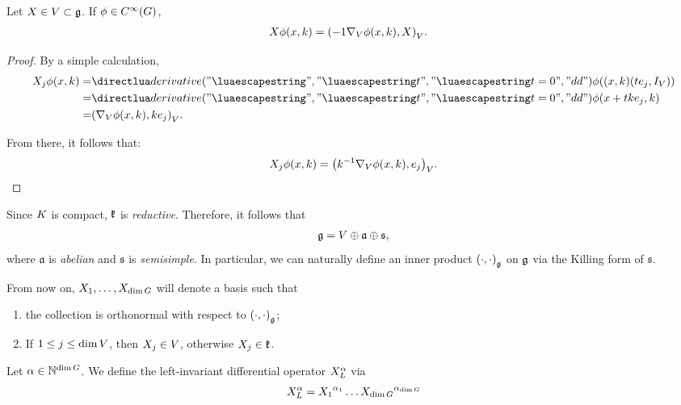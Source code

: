 \begin{lemma}
    Let $X \in \VectorSpace \subset \LieAlgebra$.
    If $\phi \in \SmoothFunctions\Group$,
    \begin{align*}
        \LeftDifferentialOperatorFirstOrder{X} \phi(x, k)
        &= \ip{{-1} \grad \phi(x, k)}{X}.
    \end{align*}
\end{lemma}
\begin{proof}
    By a simple calculation,
    \begin{align*}
        \LeftDifferentialOperatorFirstOrder{X_j} \phi(x, k)
        =& \D*{t}<t = 0> \phi((x, k) (t e_j, \Id\VectorSpace))\\
        =& \D*{t}<t = 0> \phi(x + t k e_j, k)\\
        =& \ip{\grad \phi(x, k)}{k e_j}.
    \end{align*}

    From there, it follows that:
    \begin{align*}
        \LeftDifferentialOperatorFirstOrder{X_j} \phi(x, k)
        = \ip{k^{-1} \grad \phi(x, k)}{e_j}.
    \end{align*}
\end{proof}

Since $\CompactGroup$ is compact,
$\LieAlgebraCompactGroup$ is \emph{reductive}.
Therefore, it follows that
\begin{align*}
    \LieAlgebra = \VectorSpace \oplus \mathfrak a \oplus \mathfrak s,
\end{align*}
where $\mathfrak a$ is \emph{abelian} and $\mathfrak s$ is \emph{semisimple}.
In particular, we can naturally define an inner product $\ip[\LieAlgebra]\dummy\dummy$ on $\LieAlgebra$ via the Killing form of $\mathfrak s$.

From now on,
$X_1, \dots, X_{\dim \Group}$ will denote a basis such that
\begin{enumerate}
    \item the collection is orthonormal with respect to $\ip[\LieAlgebra]\dummy\dummy$;
    \item If $1 \leq j \leq \dim \VectorSpace$, then $X_j \in \VectorSpace$,
        otherwise $X_j \in \LieAlgebraCompactGroup$.
\end{enumerate}

\begin{definition}
    Let $\alpha \in \N^{\dim \Group}$.
    We define the left-invariant differential operator $\LeftDifferentialOperator{\alpha}$ via
    \begin{align*}
        \LeftDifferentialOperator{\alpha} =
        \LeftDifferentialOperatorFirstOrder{X_1}^{\alpha_1} \dots
        \LeftDifferentialOperatorFirstOrder{X_{\dim \Group}}^{\alpha_{\dim \Group}}
    \end{align*}
\end{definition}

